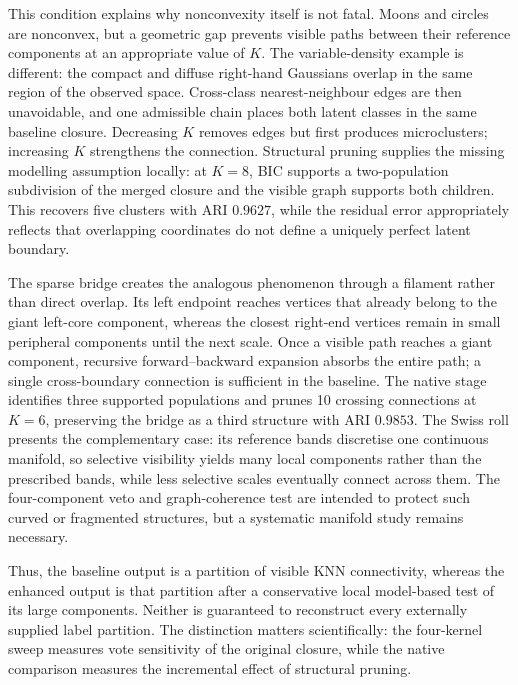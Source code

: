 \documentclass[pdflatex,sn-mathphys-num]{sn-jnl}
\begin{document}
This condition explains why nonconvexity itself is not fatal.  Moons and
circles are nonconvex, but a geometric gap prevents visible paths between their
reference components at an appropriate value of $K$.  The variable-density
example is different: the compact and diffuse right-hand Gaussians overlap in
the same region of the observed space.  Cross-class nearest-neighbour edges are
then unavoidable, and one admissible chain places both latent classes in the
same baseline closure.  Decreasing $K$ removes edges but first produces
microclusters; increasing $K$ strengthens the connection.  Structural pruning
supplies the missing modelling assumption locally: at $K=8$, BIC supports a
two-population subdivision of the merged closure and the visible graph supports
both children.  This recovers five clusters with ARI $0.9627$, while the
residual error appropriately reflects that overlapping coordinates do not
define a uniquely perfect latent boundary.

The sparse bridge creates the analogous phenomenon through a filament rather
than direct overlap.  Its left endpoint reaches vertices that already belong
to the giant left-core component, whereas the closest right-end vertices remain
in small peripheral components until the next scale.  Once a visible path
reaches a giant component, recursive forward--backward expansion absorbs the
entire path; a single cross-boundary connection is sufficient in the baseline.
The native stage identifies three supported populations and prunes 10 crossing
connections at $K=6$, preserving the bridge as a third structure with ARI
$0.9853$.  The Swiss roll presents the complementary case: its reference bands
discretise one continuous manifold, so selective visibility yields many local
components rather than the prescribed bands, while less selective scales
eventually connect across them.  The four-component veto and graph-coherence
test are intended to protect such curved or fragmented structures, but a
systematic manifold study remains necessary.

Thus, the baseline output is a partition of visible KNN connectivity, whereas
the enhanced output is that partition after a conservative local model-based
test of its large components.  Neither is guaranteed to reconstruct every
externally supplied label partition.  The distinction matters scientifically:
the four-kernel sweep measures vote sensitivity of the original closure, while
the native comparison measures the incremental effect of structural pruning.
\end{document}
